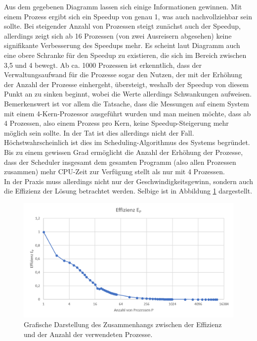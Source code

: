 \begin{description}
						Aus dem gegebenen Diagramm lassen sich einige Informationen gewinnen. Mit einem Prozess ergibt sich ein Speedup von genau 1, was auch nachvollziehbar sein sollte. Bei steigender Anzahl von Prozessen steigt zunächst auch der Speedup, allerdings zeigt sich ab 16 Prozessen (von zwei Ausreisern abgesehen) keine signifikante Verbesserung des Speedups mehr. Es scheint laut Diagramm auch eine obere Schranke für den Speedup zu existieren, die sich im Bereich zwischen 3,5 und 4 bewegt. Ab ca. 1000 Prozessen ist erkenntlich, dass der Verwaltungsaufwand für die Prozesse sogar den Nutzen, der mit der Erhöhung der Anzahl der Prozesse einhergeht, übersteigt, weshalb der Speedup von diesem Punkt an zu sinken beginnt, wobei die Werte allerdings Schwankungen aufweisen.\\
						Bemerkenswert ist vor allem die Tatsache, dass die Messungen auf einem System mit einem 4-Kern-Prozessor ausgeführt wurden und man meinen möchte, dass ab 4 Prozessen, also einem Prozess pro Kern, keine Speedup-Steigerung mehr möglich sein sollte. In der Tat ist dies allerdings nicht der Fall. Höchstwahrscheinlich ist dies im Scheduling-Algorithmus des Systems begründet. Bis zu einem gewissen Grad ermöglicht die Anzahl der Erhöhung der Prozesse, dass der Scheduler insgesamt dem gesamten Programm (also allen Prozessen zusammen) mehr CPU-Zeit zur Verfügung stellt als nur mit 4 Prozessen.\\
						In der Praxis muss allerdings nicht nur der Geschwindigkeitsgewinn, sondern auch die Effizienz der Lösung betrachtet werden. Selbige ist in Abbildung \ref{fig:Effizienz_Prozesse} dargestellt.
						
						\begin{figure}
							\centering	
							\includegraphics[width=12cm]{Abbildungen/Effizienz_Prozesse.png}
							\caption{Grafische Darstellung des Zusammenhangs zwischen der Effizienz und der Anzahl der verwendeten Prozesse.}
							\label{fig:Effizienz_Prozesse}
						\end{figure}
						

\end{description}
